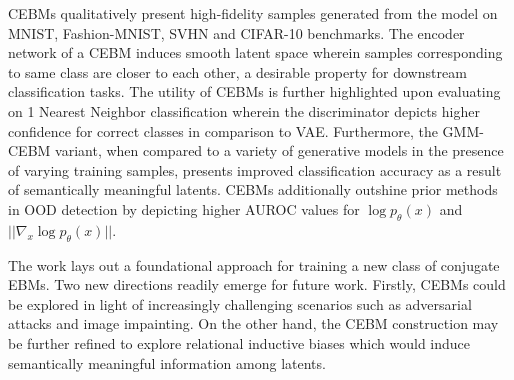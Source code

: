 \documentclass[12pt,letterpaper]{article}
\begin{document}
CEBMs qualitatively present high-fidelity samples generated from the model on MNIST, Fashion-MNIST, SVHN and CIFAR-10 benchmarks. The encoder network of a CEBM induces smooth latent space wherein samples corresponding to same class are closer to each other, a desirable property for downstream classification tasks. The utility of CEBMs is further highlighted upon evaluating on 1 Nearest Neighbor classification wherein the discriminator depicts higher confidence for correct classes in comparison to VAE. Furthermore, the GMM-CEBM variant, when compared to a variety of generative models in the presence of varying training samples, presents improved classification accuracy as a result of semantically meaningful latents. CEBMs additionally outshine prior methods in OOD detection by depicting higher AUROC values for $\log p_{\theta}(x)$ and $||\nabla_{x}\log p_{\theta}(x)||$. 

The work lays out a foundational approach for training a new class of conjugate EBMs. Two new directions readily emerge for future work. Firstly, CEBMs could be explored in light of increasingly challenging scenarios such as adversarial attacks and image impainting. On the other hand, the CEBM construction may be further refined to explore relational inductive biases which would induce semantically meaningful information among latents. 
\end{document}
